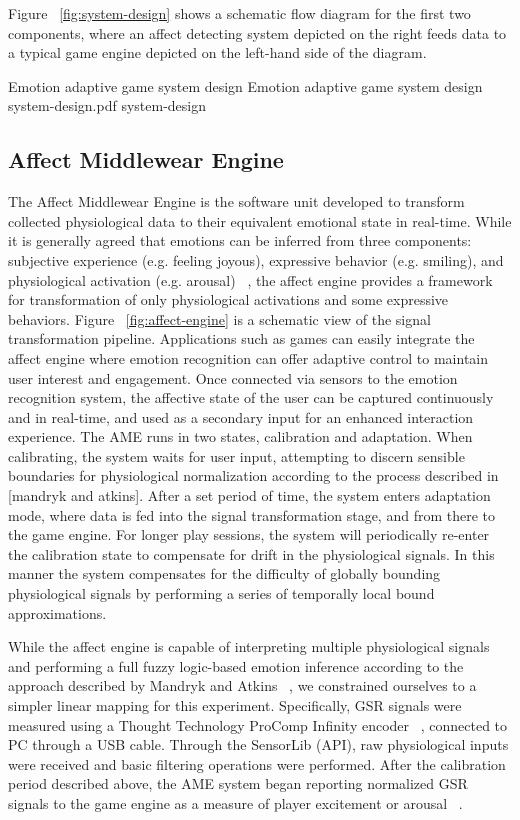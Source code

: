 \documentclass[conference]{IEEEtran}
\begin{document}
Figure ~\ref{fig:system-design} shows a schematic flow diagram for the first two components, where an affect detecting system depicted on the right feeds data to a typical game engine depicted on the left-hand side of the diagram. 

\img
{Emotion adaptive game system design}
{Emotion adaptive game system design}
{system-design.pdf}
{system-design}

\subsection{Affect Middlewear Engine}
\label{AME}
The Affect Middlewear Engine is the software unit developed to transform collected physiological data to their equivalent emotional state in real-time. While it is generally agreed that emotions can be inferred from three components: subjective experience (e.g. feeling joyous), expressive behavior (e.g. smiling), and physiological activation (e.g. arousal) ~\cite{scherer1993neuroscience}, the affect engine provides a framework for transformation of only physiological activations and some expressive behaviors. Figure ~\ref{fig:affect-engine} is a schematic view of the signal transformation pipeline. Applications such as games can easily integrate the affect engine where emotion recognition can offer adaptive control to maintain user interest and engagement. Once connected via sensors to the emotion recognition system, the affective state of the user can be captured continuously and in real-time, and used as a secondary input for an enhanced interaction experience. The AME runs in two states, calibration and adaptation. When calibrating, the system waits for user input, attempting to discern sensible boundaries for physiological normalization according to the process described in [mandryk and atkins]. After a set period of time, the system enters adaptation mode, where data is fed into the signal transformation stage, and from there to the game engine. For longer play sessions, the system will periodically re-enter the calibration state to compensate for drift in the physiological signals. In this manner the system compensates for the difficulty of globally bounding physiological signals by performing a series of temporally local bound approximations. 

While the affect engine is capable of interpreting multiple physiological signals and performing a full fuzzy logic-based emotion inference according to the approach described by Mandryk and Atkins ~\cite{mandryk2007fuzzy}, we constrained ourselves to a simpler linear mapping for this experiment. Specifically, GSR signals were measured using a Thought Technology ProComp Infinity encoder ~\cite{tt2013procomp}, connected to PC through a USB cable. Through the SensorLib (API), raw physiological inputs were received and basic filtering operations were performed. After the calibration period described above, the AME system began reporting normalized GSR signals to the game engine as a measure of player excitement or arousal ~\cite{aggag2011affective, tijs2009creating}.
\end{document}
